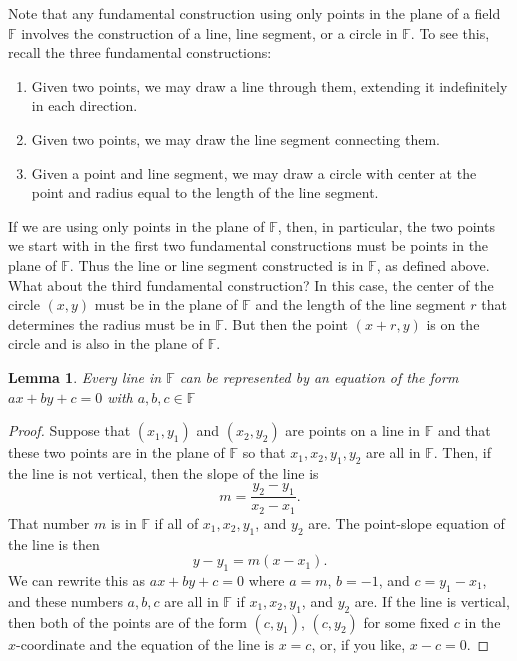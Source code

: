 \documentclass[11pt]{article}
\newtheorem{lemma}[theorem]{Lemma}
\theoremstyle{definition}
\begin{document}
Note that any fundamental construction using only points in the plane of a field $\mathbb{F}$ involves the construction of a line, line segment, 
or a circle in $\mathbb{F}$. To see this, recall the three fundamental constructions:
  \begin{enumerate}
    \item Given two points, we may draw a line through them, extending it indefinitely in each direction.
    \item Given two points, we may draw the line segment connecting them.
    \item Given a point and line segment, we may draw a circle with center at the point and radius equal to the length of the line segment.
  \end{enumerate}
If we are using only points in the plane of $\mathbb{F}$, then, in particular, the two points we start with in the first two fundamental constructions
must be points in the plane of $\mathbb{F}$. Thus the line or line segment constructed is in $\mathbb{F}$, as defined above. What about the third
fundamental construction? In this case, the center of the circle $(x,y)$ must be in the plane of $\mathbb{F}$ and the length of the line segment $r$ 
that determines the radius must be in $\mathbb{F}$. But then the point $(x+r,y)$ is on the circle and is also in the plane of $\mathbb{F}$.

\begin{lemma}
  Every line in $\mathbb{F}$ can be represented by an equation of the form $ax+by+c = 0$ with $a,b,c\in\mathbb{F}$
  \label{lemma: line in F}
\end{lemma}
\begin{proof}
  Suppose that $(x_1,y_1)$ and $(x_2,y_2)$ are points on a line in $\mathbb{F}$ and that these two points are in the plane of $\mathbb{F}$ so that
  $x_1, x_2,y_1,y_2$ are all in $\mathbb{F}$.
  Then, if the line is not vertical, then the slope of the line is
  \[ m = \frac{y_2-y_1}{x_2-x_1}. \]
  That number $m$ is in $\mathbb{F}$ if all of $x_1, x_2, y_1$, and $y_2$ are. The point-slope equation of the line is then
  \[ y-y_1 = m(x-x_1).\]
  We can rewrite this as $ax+by+c=0$ where $a=m$, $b=-1$, and $c=y_1-x_1$, and these numbers $a,b,c$ are all in $\mathbb{F}$ if $x_1, x_2, y_1$, and $y_2$
  are. If the line is vertical, then both of the points are of the form $(c,y_1)$, $(c,y_2)$ for some fixed $c$ in the $x$-coordinate and the equation of
  the line is $x=c$, or, if you like, $x-c=0$.
\end{proof}
\end{document}
